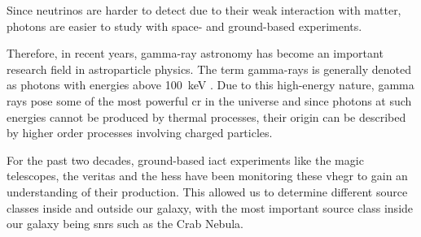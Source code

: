 Since neutrinos are harder to detect due to their weak interaction with matter, photons are easier to study
with space- and ground-based experiments.

Therefore, in recent years, gamma-ray astronomy has become an important research field in astroparticle physics.
The term gamma-rays is generally denoted as photons with energies above \SI{100}{\kilo\eV}
\cite{funk}. Due to this high-energy nature, gamma rays pose some of the most powerful \gls{cr} in
the universe and since photons at such energies cannot be produced by thermal processes, their origin
can be described by higher order processes involving charged particles.

For the past two decades, ground-based \gls{iact} experiments like the \gls{magic} telescopes, the
\gls{veritas} and the \gls{hess} have been monitoring these \gls{vhegr} to gain an understanding of
their production. This allowed us to determine different source classes inside and outside our galaxy,
with the most important source class inside our galaxy being \glspl{snr} such as the Crab Nebula.




